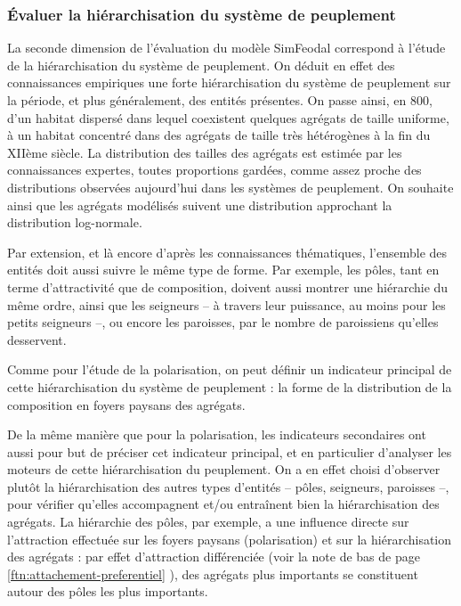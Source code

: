 \subsubsection{Évaluer la hiérarchisation du système de peuplement}

La seconde dimension de l'évaluation du modèle SimFeodal correspond à l'étude de la hiérarchisation du système de peuplement.
On déduit en effet des connaissances empiriques une forte hiérarchisation du système de peuplement sur la période, et plus généralement, des entités présentes. On passe ainsi, en 800, d'un habitat dispersé dans lequel coexistent quelques agrégats de taille uniforme, à un habitat concentré dans des agrégats de taille très hétérogènes à la fin du XIIème siècle. La distribution des tailles des agrégats est estimée par les connaissances expertes, toutes proportions gardées, comme assez proche des distributions observées aujourd'hui dans les systèmes de peuplement.
On souhaite ainsi que les agrégats modélisés suivent une distribution approchant la distribution log-normale.

Par extension, et là encore d'après les connaissances thématiques, l'ensemble des entités doit aussi suivre le même type de forme. Par exemple, les pôles, tant en terme d'attractivité que de composition, doivent aussi montrer une hiérarchie du même ordre, ainsi que les seigneurs -- à travers leur puissance, au moins pour les petits seigneurs --, ou encore les paroisses, par le nombre de paroissiens qu'elles desservent.

Comme pour l'étude de la polarisation, on peut définir un indicateur principal de cette hiérarchisation du système de peuplement : la forme de la distribution de la composition en foyers paysans des agrégats.

De la même manière que pour la polarisation, les indicateurs secondaires ont aussi pour but de préciser cet indicateur principal, et en particulier d'analyser les moteurs de cette hiérarchisation du peuplement.
On a en effet choisi d'observer plutôt la hiérarchisation des autres types d'entités -- pôles, seigneurs, paroisses --, pour vérifier qu'elles accompagnent et/ou entraînent bien la hiérarchisation des agrégats. La hiérarchie des pôles, par exemple, a une influence directe sur l'attraction effectuée sur les foyers paysans (polarisation) et sur la hiérarchisation des agrégats : par effet d'attraction différenciée (voir la note de bas de page \ref{ftn:attachement-preferentiel} ), des agrégats plus importants se constituent autour des pôles les plus importants.

